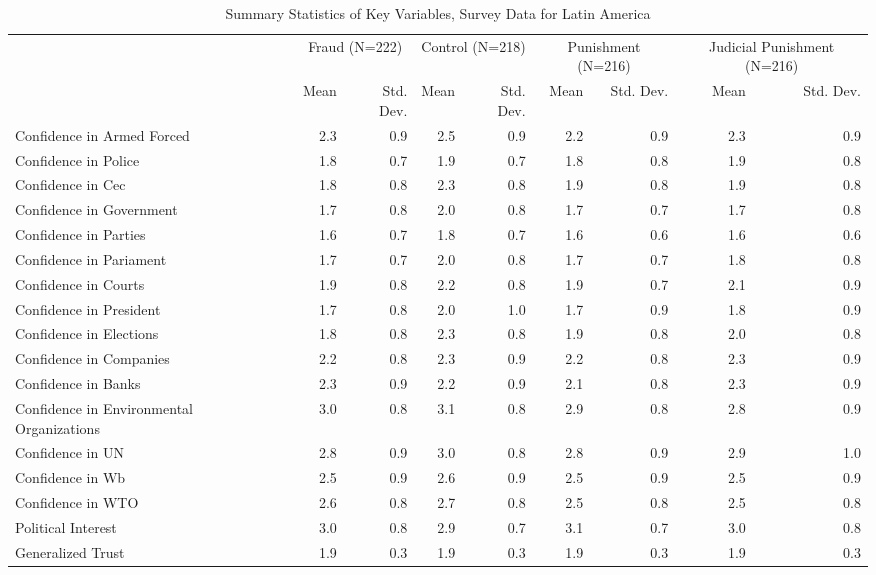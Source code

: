 \begin{table}

\caption{Summary Statistics of Key Variables, Survey Data for Latin America}
\centering
\begin{tabular}[t]{llrrrrrrrr}
\toprule
\multicolumn{2}{c}{ } & \multicolumn{2}{c}{Fraud (N=222)} & \multicolumn{2}{c}{Control (N=218)} & \multicolumn{2}{c}{Punishment (N=216)} & \multicolumn{2}{c}{Judicial Punishment (N=216)} \\
\cmidrule(l{3pt}r{3pt}){3-4} \cmidrule(l{3pt}r{3pt}){5-6} \cmidrule(l{3pt}r{3pt}){7-8} \cmidrule(l{3pt}r{3pt}){9-10}
  &    & Mean & Std. Dev. & Mean & Std. Dev. & Mean & Std. Dev. & Mean & Std. Dev.\\
\midrule
Confidence in Armed Forced &  & 2.3 & 0.9 & 2.5 & 0.9 & 2.2 & 0.9 & 2.3 & 0.9\\
Confidence in Police &  & 1.8 & 0.7 & 1.9 & 0.7 & 1.8 & 0.8 & 1.9 & 0.8\\
Confidence in Cec &  & 1.8 & 0.8 & 2.3 & 0.8 & 1.9 & 0.8 & 1.9 & 0.8\\
Confidence in Government &  & 1.7 & 0.8 & 2.0 & 0.8 & 1.7 & 0.7 & 1.7 & 0.8\\
Confidence in Parties &  & 1.6 & 0.7 & 1.8 & 0.7 & 1.6 & 0.6 & 1.6 & 0.6\\
Confidence in Pariament &  & 1.7 & 0.7 & 2.0 & 0.8 & 1.7 & 0.7 & 1.8 & 0.8\\
Confidence in Courts &  & 1.9 & 0.8 & 2.2 & 0.8 & 1.9 & 0.7 & 2.1 & 0.9\\
Confidence in President &  & 1.7 & 0.8 & 2.0 & 1.0 & 1.7 & 0.9 & 1.8 & 0.9\\
Confidence in Elections &  & 1.8 & 0.8 & 2.3 & 0.8 & 1.9 & 0.8 & 2.0 & 0.8\\
Confidence in Companies &  & 2.2 & 0.8 & 2.3 & 0.9 & 2.2 & 0.8 & 2.3 & 0.9\\
Confidence in Banks &  & 2.3 & 0.9 & 2.2 & 0.9 & 2.1 & 0.8 & 2.3 & 0.9\\
Confidence in Environmental Organizations &  & 3.0 & 0.8 & 3.1 & 0.8 & 2.9 & 0.8 & 2.8 & 0.9\\
Confidence in UN &  & 2.8 & 0.9 & 3.0 & 0.8 & 2.8 & 0.9 & 2.9 & 1.0\\
Confidence in Wb &  & 2.5 & 0.9 & 2.6 & 0.9 & 2.5 & 0.9 & 2.5 & 0.9\\
Confidence in WTO &  & 2.6 & 0.8 & 2.7 & 0.8 & 2.5 & 0.8 & 2.5 & 0.8\\
Political Interest &  & 3.0 & 0.8 & 2.9 & 0.7 & 3.1 & 0.7 & 3.0 & 0.8\\
Generalized Trust &  & 1.9 & 0.3 & 1.9 & 0.3 & 1.9 & 0.3 & 1.9 & 0.3\\

\end{tabular}
\end{table}

